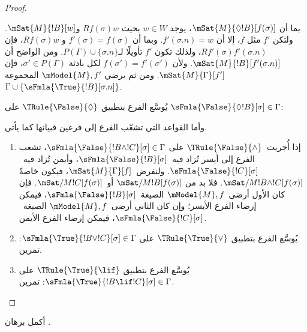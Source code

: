 \documentclass[../../../include/open-logic-section]{subfiles}
\begin{document}
\begin{proof}
\begin{enumerate}
{{  بما أن $\mSat{M}{\Diamond !B}[f(\sigma)]$، يوجد $w \in W$ بحيث
  $Rf(\sigma)w$ و$\mSat{M}{!B}[w]$. ولتكن $f'$ مثل $f$، إلا أن
  $f'(\sigma.n) = w$. وبما أن $f'(\sigma) = f(\sigma)$ و
  $Rf(\sigma)w$، فإن $Rf'(\sigma)f'(\sigma.n)$، ولذلك تكون $f'$
  تأويلًا لـ$P(\Gamma) \cup \{\sigma.n\}$. ومن الواضح أن
  $\mSat{M}{!B}[f'(\sigma.n)]$. ولأن $f(\sigma') = f'(\sigma')$ لكل
  بادئة $\sigma' \in P(\Gamma)$، فإن $\mSat{M}{\Gamma}[f']$. ومن ثم
  يرضي $\mModel{M}, f'$ المجموعة $\Gamma \cup
  \{\sFmla{\True}{!B}[\sigma.n]\}$.}
\item يُوسَّع الفرع بتطبيق $\TRule{\False}{\Diamond}$ على
  $\sFmla{\False}{\Diamond !B}[\sigma] \in \Gamma$:
  }{}
\end{enumerate}
وأما القواعد التي تشعّب الفرع إلى فرعين فبيانها كما يأتي.
\begin{enumerate}
\item إذا أُجريت~$\TRule{\False}{\land}$ على
  $\sFmla{\False}{!B \land !C}[\sigma] \in \Gamma$،
  تشعب الفرع إلى أيسر تُزاد فيه~$\sFmla{\False}{!B}[\sigma]$،
  وأيمن تُزاد فيه~$\sFmla{\False}{!C}[\sigma]$.
  ولنفرض~$\mSat{M}{\Gamma}[f]$، فيكون خاصةً
  $\mSat/{M}{!B \land !C}[f(\sigma)]$. فلا بد من
  $\mSat/{M}{!B}[f(\sigma)]$ أو~$\mSat/{M}{!C}[f(\sigma)]$.
  فإن كان الأول أرضى~$\mModel{M}, f$
  الصيغة~$\sFmla{\False}{!B}[\sigma]$، فيمكن إرضاء الفرع الأيسر؛
  وإن كان الثاني أرضى~$\mModel{M}, f$
  الصيغة~$\sFmla{\False}{!C}[\sigma]$، فيمكن إرضاء الفرع الأيمن.
\item يُوسَّع الفرع بتطبيق $\TRule{\True}{\lor}$ على
    $\sFmla{\True}{!B \lor !C}[\sigma] \in \Gamma$: تمرين.
\item يُوسَّع الفرع بتطبيق $\TRule{\True}{\lif}$ على
    $\sFmla{\True}{!B \lif !C}[\sigma] \in \Gamma$: تمرين.
\end{enumerate}
\end{proof}

\begin{prob}
أكمل برهان .
\end{prob}
\end{document}
